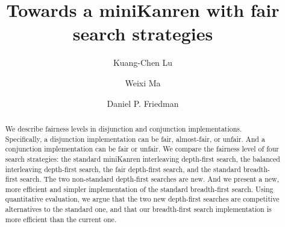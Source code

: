 \documentclass[format=acmlarge, review=true, authordraft=true]{acmart}
\title{Towards a miniKanren with fair search strategies}
\author{Kuang-Chen Lu}
\affiliation{Indiana University}
\author{Weixi Ma}
\affiliation{Indiana University}
\author{Daniel P. Friedman}
\affiliation{Indiana University}
\newcommand{\conde}{\texttt{cond$^e$}}
\newcommand{\conj}{\texttt{conj}}
\newcommand{\disj}{\texttt{disj}}
\newcommand{\DFSi }[0]{DFS$_{i}$}
\newcommand{\DFSf }[0]{DFS$_{f}$}
\newcommand{\DFSbi}[0]{DFS$_{bi}$}
\newcommand{\BFSser}[0]{BFS}
\begin{document}

\begin{abstract}

We describe fairness levels in disjunction and conjunction
implementations.  Specifically, a disjunction implementation can be
fair, almost-fair, or unfair. And a conjunction implementation can
be fair or unfair.  We compare the fairness level of four search
strategies: the standard miniKanren interleaving depth-first search,
the balanced interleaving depth-first search, the fair depth-first
search, and the standard breadth-first search.
The two non-standard depth-first searches are new. And we present a new, more 
efficient and simpler implementation of the standard breadth-first search. Using 
quantitative evaluation, we argue that the two new depth-first searches are 
competitive alternatives to the standard one, 
and that our breadth-first search implementation is more efficient than 
the current one.


% 

\end{abstract}
\end{document}

